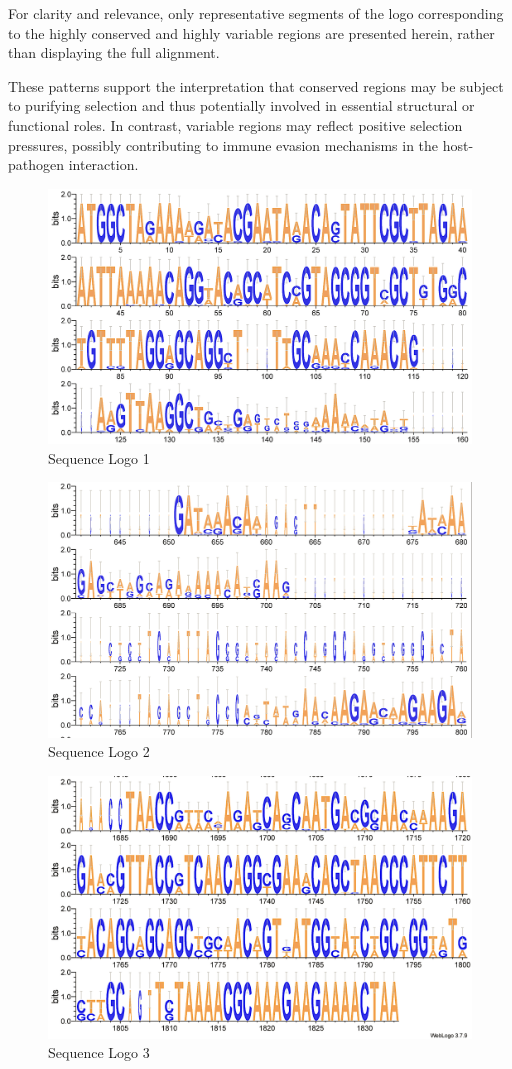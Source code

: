 \documentclass[
]{article}
\begin{document}
For clarity and relevance, only representative segments of the logo
corresponding to the highly conserved and highly variable regions are
presented herein, rather than displaying the full alignment.

These patterns support the interpretation that conserved regions may be
subject to purifying selection and thus potentially involved in
essential structural or functional roles. In contrast, variable regions
may reflect positive selection pressures, possibly contributing to
immune evasion mechanisms in the host-pathogen interaction.

\begin{figure}

{\centering \includegraphics[width=0.6\linewidth]{Images/WebLogo1} 

}

\caption{Sequence Logo 1}\label{fig:unnamed-chunk-41}
\end{figure}

\begin{figure}

{\centering \includegraphics[width=0.6\linewidth]{Images/WebLogo2} 

}

\caption{ Sequence Logo 2}\label{fig:unnamed-chunk-42}
\end{figure}

\begin{figure}

{\centering \includegraphics[width=0.6\linewidth]{Images/WebLogo3} 

}

\caption{ Sequence Logo 3}\label{fig:unnamed-chunk-43}
\end{figure}
\end{document}
